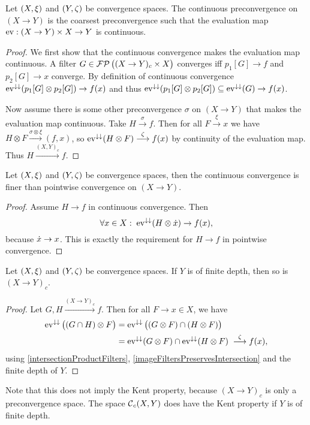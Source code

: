 \begin{lemma}
Let $\left( X,\xi \right)$ and $\left( Y,\zeta \right)$ be convergence spaces. The continuous preconvergence on $(X\to Y)$ is the coarsest preconvergence such that the evaluation map $\operatorname{ev}: (X\to Y)\times X \to Y$ is continuous.
\end{lemma}
\begin{proof}
We first show that the continuous convergence makes the evaluation map continuous. A filter $G\in\operatorname{\mathcal{FP}}\big((X\to Y)_c\times X\big)$ converges iff $p_1[G]\to f$ and $p_2[G]\to x$ converge. By definition of continuous convergence $\operatorname{ev}^{\downarrow\downarrow}(p_1[G] \otimes p_2[G]) \to f(x)$ and thus $\operatorname{ev}^{\downarrow\downarrow}(p_1[G] \otimes p_2[G]) \subseteq \operatorname{ev}^{\downarrow\downarrow}(G) \to f(x)$.

Now assume there is some other preconvergence $\sigma$ on $(X\to Y)$ that makes the evaluation map continuous. Take $H \overset{\sigma}{\longrightarrow} f$. Then for all $F\overset{\xi}{\longrightarrow}x$ we have $H\otimes F\overset{\sigma\otimes \xi}{\longrightarrow} (f,x)$, so $\operatorname{ev}^{\downarrow\downarrow}(H\otimes F) \overset{\zeta}{\longrightarrow} f(x)$ by continuity of the evaluation map. Thus $H\overset{(X,Y)_c}{\longrightarrow} f$.
\end{proof}

\begin{lemma}
Let $\left( X,\xi \right)$ and $\left( Y,\zeta \right)$ be convergence spaces, then the continuous convergence is finer than pointwise convergence on $(X\to Y)$.
\end{lemma}
\begin{proof}
Assume $H\to f$ in continuous convergence. Then
\[ \forall x\in X: \; \operatorname{ev}^{\downarrow\downarrow}(H\otimes \dot{x}) \to f(x), \]
because $\dot{x}\to x$. This is exactly the requirement for $H\to f$ in pointwise convergence.
\end{proof}


\begin{lemma}
Let $\left( X,\xi \right)$ and $\left( Y,\zeta \right)$ be convergence spaces. If $Y$ is of finite depth, then so is $(X\to Y)_c$.
\end{lemma}
\begin{proof}
Let $G, H\overset{(X\to Y)_c}{\longrightarrow} f$. Then for all $F\to x\in X$, we have
\begin{align*}
\operatorname{ev}^{\downarrow\downarrow}\big((G\cap H)\otimes F\big) &= \operatorname{ev}^{\downarrow\downarrow}\big((G \otimes F) \cap (H \otimes F)\big) \\
&= \operatorname{ev}^{\downarrow\downarrow}(G \otimes F) \cap \operatorname{ev}^{\downarrow\downarrow}(H \otimes F) \; \overset{\zeta}{\longrightarrow} f(x),
\end{align*}
using \ref{intersectionProductFilters}, \ref{imageFiltersPreservesIntersection} and the finite depth of $Y$.
\end{proof}
Note that this does not imply the Kent property, because $(X\to Y)_c$ is only a preconvergence space. The space $\operatorname{\mathcal{C}}_c(X,Y)$ does have the Kent property if $Y$ is of finite depth.


